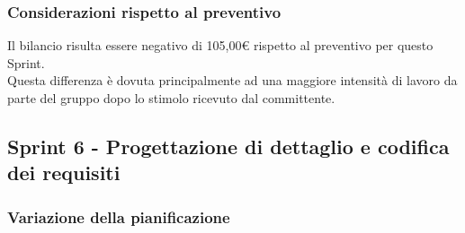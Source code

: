 \subsubsection{Considerazioni rispetto al preventivo} \label{subsubsection:considerazioni_finali_sprint6}
Il bilancio risulta essere negativo di 105,00€ rispetto al preventivo per questo Sprint\glo{}.
\\Questa differenza è dovuta principalmente ad una maggiore intensità di lavoro da parte del gruppo dopo lo stimolo ricevuto dal committente.



\subsection{Sprint 6 - Progettazione di dettaglio e codifica dei requisiti} \label{subsection:consuntivo_sprint6}
\subsubsection{Variazione della pianificazione} \label{subsubsection:variazione_pianificazione_sprint6}

